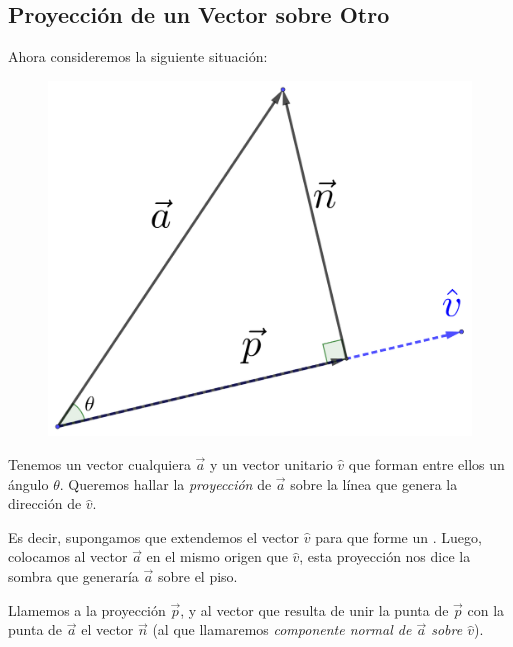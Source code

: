 \documentclass[12pt, fleqn]{report}                             %
\newcommand \Quote {\qq}                                        %
\theoremstyle{break}                                            %
\begin{document}
            \clearpage
            \subsection{Proyección de un Vector sobre Otro}
            
                Ahora consideremos la siguiente situación:

                \begin{figure}[H]
                    \centering
                    \includegraphics[scale=1]{vectorProyection}
                \end{figure}

                Tenemos un vector cualquiera $\vec{a}$ y un vector unitario $\hat{v}$ que forman
                entre ellos un ángulo $\theta$.
                Queremos hallar la \emph{proyección} de $\vec{a}$ sobre la línea que genera la
                dirección de $\hat{v}$.
                
                Es decir, supongamos que extendemos el vector $\hat{v}$ para que forme un \Quote{piso}.
                Luego, colocamos al vector $\vec{a}$ en el mismo origen que $\hat{v}$, esta proyección
                nos dice la sombra que generaría $\vec{a}$ sobre el piso.
                
                Llamemos a la proyección $\vec{p}$, y al vector que resulta de unir la punta de $\vec{p}$
                con la punta de $\vec{a}$ el vector $\vec{n}$ (al que llamaremos \emph{componente normal
                de $\vec{a}$ sobre $\hat{v}$}).
                
\end{document}
